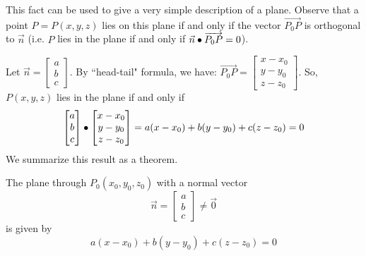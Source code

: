 \documentclass{ximera}
\begin{document}
 
This fact can be used to give a very simple description of a
plane.
 Observe that a point $P = P(x, y, z)$ lies on this plane if and only if the vector $\overrightarrow{P_{0}P}$ is orthogonal to $\vec{n}$ (i.e. $P$ lies in the plane if and only if $\vec{n} \bullet \overrightarrow{P_{0}P} = 0$).
  
 \begin{center}
           
\end{center}


  
Let $\vec{n}=\begin{bmatrix}a\\b\\c\end{bmatrix}$.  By ``head-tail" formula, we have: $\overrightarrow{P_{0}P} = \begin{bmatrix}
x - x_{0}\\
y - y_{0}\\
z - z_{0}
\end{bmatrix}$. So, $P(x, y, z)$ lies in the plane if and only if
$$\begin{bmatrix}a\\b\\c\end{bmatrix}\bullet\begin{bmatrix}
x - x_{0}\\
y - y_{0}\\
z - z_{0}
\end{bmatrix}=a(x-x_0)+b(y-y_0)+c(z-z_0)=0$$
We summarize this result as a theorem.
 
\begin{theorem}\label{th:scalareqofplane}
The plane through $P_{0}(x_{0}, y_{0}, z_{0})$ with a normal vector $$\vec{n} =
\begin{bmatrix}
a\\
b\\
c
\end{bmatrix}\neq\vec{0}$$
 is given by
\begin{equation}\label{eq:plane}
a(x - x_{0}) + b(y - y_{0}) + c(z - z_{0}) = 0
\end{equation}
\end{theorem}
 
\end{document}
